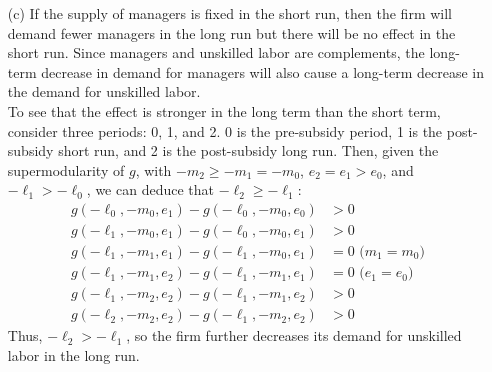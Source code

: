 \documentclass{article}
\begin{document}
\begin{itemize}
	\item[(c)] If the supply of managers is fixed in the short run, then the firm will demand fewer managers in the long run but there will be no effect in the short run. Since managers and unskilled labor are complements, the long-term decrease in demand for managers will also cause a long-term decrease in the demand for unskilled labor. 
		\smallskip \\
		To see that the effect is stronger in the long term than the short term, consider three periods: 0, 1, and 2. 0 is the pre-subsidy period, 1 is the post-subsidy short run, and 2 is the post-subsidy long run. Then, given the supermodularity of $g$, with $-m_2\geq-m_1=-m_0$, $e_2=e_1>e_0$, and $-\ell_1>-\ell_0$, we can deduce that $-\ell_2\geq-\ell_1$:
		\begin{align*}
			g(-\ell_0,-m_0,e_1) - g(-\ell_0,-m_0,e_0)	&> 0									\\
			g(-\ell_1,-m_0,e_1) - g(-\ell_0,-m_0,e_1)	&> 0									\\
			g(-\ell_1,-m_1,e_1) - g(-\ell_1,-m_0,e_1)	&= 0\text{ (}m_1=m_0\text{)}	\\
			g(-\ell_1,-m_1,e_2) - g(-\ell_1,-m_1,e_1)	&= 0\text{ (}e_1=e_0\text{)}	\\
			g(-\ell_1,-m_2,e_2) - g(-\ell_1,-m_1,e_2)	&> 0									\\
			g(-\ell_2,-m_2,e_2) - g(-\ell_1,-m_2,e_2)	&> 0	
		\end{align*}
		Thus, $-\ell_2>-\ell_1$, so the firm further decreases its demand for unskilled labor in the long run.
	
\end{itemize}	


\end{document}

